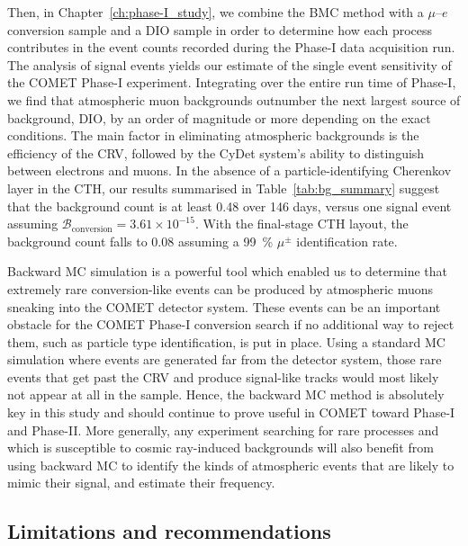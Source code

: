 Then, in Chapter~\ref{ch:phase-I_study}, we combine the BMC method with a
$\mu$--$e$ conversion sample and a DIO sample in order to determine how each
process contributes in the event counts recorded during the Phase-I data
acquisition run. The analysis of signal events yields our estimate of the single
event sensitivity of the COMET Phase-I experiment. Integrating over the entire
run time of Phase-I, we find that atmospheric muon backgrounds outnumber the
next largest source of background, DIO, by an order of magnitude or more
depending on the exact conditions. The main factor in eliminating atmospheric
backgrounds is the efficiency of the CRV, followed by the CyDet system's ability
to distinguish between electrons and muons. In the absence of a
particle-identifying Cherenkov layer in the CTH, our results summarised in
Table~\ref{tab:bg_summary} suggest that the background count is at least 0.48
over 146 days, versus one signal event assuming $\mathcal{B}_\mathrm{conversion}
= 3.61 \times 10^{-15}$. With the final-stage CTH layout, the background count
falls to 0.08 assuming a \SI{99}{\percent} $\mu^\pm$ identification rate.


Backward MC simulation is a powerful tool which enabled us to determine that
extremely rare conversion-like events can be produced by atmospheric muons
sneaking into the COMET detector system. These events can be an important
obstacle for the COMET Phase-I conversion search if no additional way to
reject them, such as particle type identification, is put in place. Using a
standard MC simulation where events are generated far from the detector system,
those rare events that get past the CRV and produce signal-like tracks would
most likely not appear at all in the sample. Hence, the backward MC method is
absolutely key in this study and should continue to prove useful in COMET toward
Phase-I and Phase-II. More generally, any experiment searching for rare
processes and which is susceptible to cosmic ray-induced backgrounds will also
benefit from using backward MC to identify the kinds of atmospheric events that
are likely to mimic their signal, and estimate their frequency.

\subsection{Limitations and recommendations}


